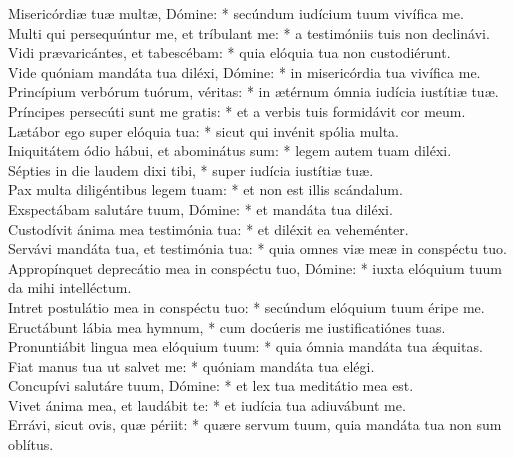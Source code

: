 {	Misericórdiæ tuæ multæ, Dómine: * secúndum iudícium tuum vivífica me. \\
	Multi qui persequúntur me, et tríbulant me: * a testimóniis tuis non declinávi. \\
	Vidi prævaricántes, et tabescébam: * quia elóquia tua non custodiérunt. \\
	Vide quóniam mandáta tua diléxi, Dómine: * in misericórdia tua vivífica me. \\
	Princípium verbórum tuórum, véritas: * in ætérnum ómnia iudícia iustítiæ tuæ. \\
	Príncipes persecúti sunt me gratis: * et a verbis tuis formidávit cor meum. \\
	Lætábor ego super elóquia tua: * sicut qui invénit spólia multa. \\
	Iniquitátem ódio hábui, et abominátus sum: * legem autem tuam diléxi. \\
	Sépties in die laudem dixi tibi, * super iudícia iustítiæ tuæ. \\
	Pax multa diligéntibus legem tuam: * et non est illis scándalum. \\
	Exspectábam salutáre tuum, Dómine: * et mandáta tua diléxi. \\
	Custodívit ánima mea testimónia tua: * et diléxit ea veheménter. \\
	Servávi mandáta tua, et testimónia tua: * quia omnes viæ meæ in conspéctu tuo. \\
	Appropínquet deprecátio mea in conspéctu tuo, Dómine: * iuxta elóquium tuum da mihi intelléctum. \\
	Intret postulátio mea in conspéctu tuo: * secúndum elóquium tuum éripe me. \\
	Eructábunt lábia mea hymnum, * cum docúeris me iustificatiónes tuas. \\
	Pronuntiábit lingua mea elóquium tuum: * quia ómnia mandáta tua ǽquitas. \\
	Fiat manus tua ut salvet me: * quóniam mandáta tua elégi. \\
	Concupívi salutáre tuum, Dómine: * et lex tua meditátio mea est. \\
	Vivet ánima mea, et laudábit te: * et iudícia tua adiuvábunt me. \\
	Errávi, sicut ovis, quæ périit: * quære servum tuum, quia mandáta tua non sum oblítus. \\
}

